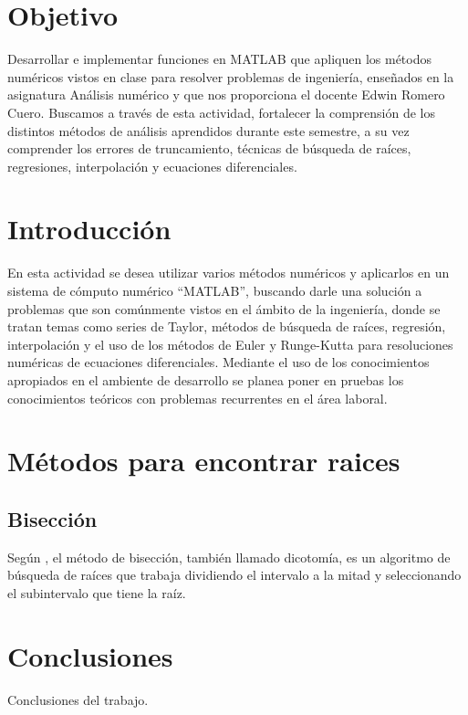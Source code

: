 \documentclass[12pt,a4paper]{article}
\begin{document}
\section{Objetivo}
Desarrollar e implementar funciones en MATLAB que apliquen los métodos numéricos vistos en clase para resolver problemas de ingeniería, enseñados en la asignatura Análisis numérico y que nos proporciona el docente Edwin Romero Cuero.
\noindent
Buscamos a través de esta actividad, fortalecer la comprensión de los distintos métodos de análisis aprendidos durante este semestre, a su vez comprender los errores de truncamiento, técnicas de búsqueda de raíces, regresiones, interpolación y ecuaciones diferenciales.

\section{Introducción}

En esta actividad se desea utilizar varios métodos numéricos y aplicarlos en un sistema de cómputo numérico “MATLAB”, buscando darle una solución a problemas que son comúnmente vistos en el ámbito de la ingeniería, donde se tratan temas como series de Taylor, métodos de búsqueda de raíces, regresión, interpolación y el uso de los métodos de Euler y Runge-Kutta para resoluciones numéricas de ecuaciones diferenciales. Mediante el uso de los conocimientos apropiados en el ambiente de desarrollo se planea poner en pruebas los conocimientos teóricos con problemas recurrentes en el área laboral.


\section{Métodos para encontrar raices}

\subsection{Bisección}

Según \cite{wikipedia_biseccion}, el método de bisección, también llamado dicotomía, es un algoritmo de búsqueda de raíces que trabaja dividiendo el intervalo a la mitad y seleccionando el subintervalo que tiene la raíz.

\section{Conclusiones}

Conclusiones del trabajo.

\newpage



\end{document}
